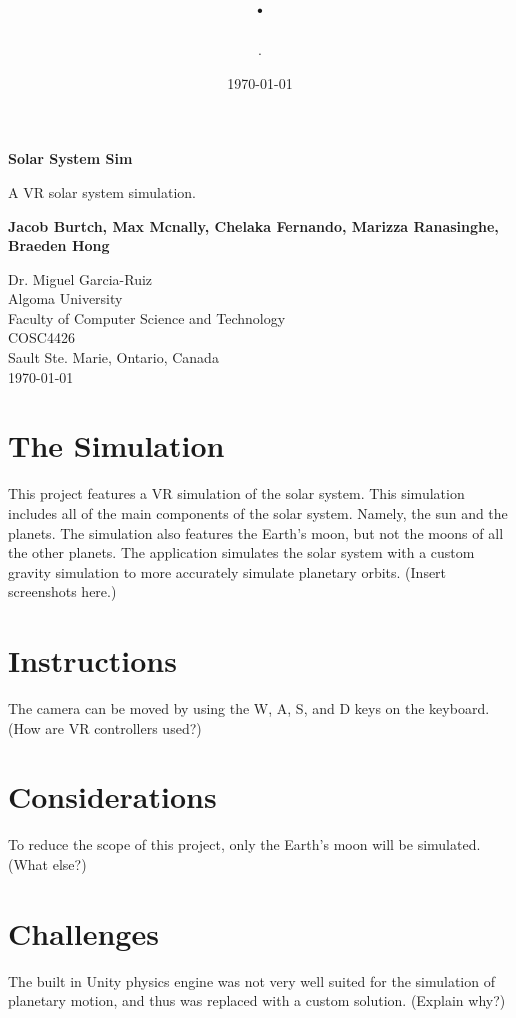 \documentclass{article}
\author{.}
\title{.}
\date{\today}
\begin{document}
    \begin{titlepage}
        \begin{center}
            \vspace*{\fill}

            \Huge
            \textbf{Solar System Sim}

            \vspace{0.5cm}
            \Large
            A VR solar system simulation.

            \vspace{1.5cm}

            \textbf{Jacob Burtch, Max Mcnally, Chelaka Fernando, Marizza Ranasinghe, Braeden Hong}

            \Large
            Dr. Miguel Garcia-Ruiz\\
            Algoma University\\
            Faculty of Computer Science and Technology\\
            COSC4426\\
            Sault Ste. Marie, Ontario, Canada\\
            \today
            \vspace*{\fill}
        \end{center}
    \end{titlepage}
    \newpage
    \section{The Simulation}
    This project features a VR simulation of the solar system. This simulation includes all of the main components of the solar system. Namely, the sun and the planets. The simulation also features the Earth's moon, but not the moons of all the other planets. The application simulates the solar system with a custom gravity simulation to more accurately simulate planetary orbits. (Insert screenshots here.)
    \section{Instructions}
    The camera can be moved by using the W, A, S, and D keys on the keyboard. (How are VR controllers used?)
    \section{Considerations}
    To reduce the scope of this project, only the Earth's moon will be simulated. (What else?)
    \section{Challenges}
    The built in Unity physics engine was not very well suited for the simulation of planetary motion, and thus was replaced with a custom solution. (Explain why?)
    \newpage
    
    
\end{document}
